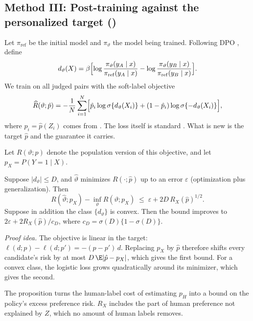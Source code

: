 \subsection{Method III: Post-training against the personalized target (\fsppo)}
\label{sec:post-training}

Let $\pi_{\mathrm{ref}}$ be the initial model and $\pi_\vartheta$ the model being trained. Following
DPO \citep{rafailov2023dpo}, define
\[
  d_\vartheta(X)=\beta\Bigl[\log\frac{\pi_\vartheta(y_A\mid x)}{\pi_{\mathrm{ref}}(y_A\mid x)}
  -\log\frac{\pi_\vartheta(y_B\mid x)}{\pi_{\mathrm{ref}}(y_B\mid x)}\Bigr].
\]
We train on all judged pairs with the soft-label objective
\[
  \widehat R(\vartheta;\hat p)=-\frac1N\sum_{i=1}^{N}
  \Bigl[\hat p_i\log\sigma\{d_\vartheta(X_i)\}+(1-\hat p_i)\log\sigma\{-d_\vartheta(X_i)\}\Bigr],
\]
where $\hat p_i=\hat p(Z_i)$ comes from \dfsp. The loss itself is standard
\citep{lee2024rlaif,furuta2024gapo}. What is new is the target $\hat p$ and the guarantee it carries.

Let $R(\vartheta;p)$ denote the population version of this objective, and let $p_X=P(Y=1\mid X)$.

\begin{proposition}
\label{prop:bridge}
Suppose $|d_\vartheta|\le D$, and $\hat\vartheta$ minimizes $R(\cdot;\hat p)$ up to an error
$\varepsilon$ (optimization plus generalization). Then
\[
  R(\hat\vartheta;p_X)-\inf_\vartheta R(\vartheta;p_X)\;\le\;\varepsilon+2D\,R_X(\hat p)^{1/2}.
\]
Suppose in addition the class $\{d_\vartheta\}$ is convex. Then the bound improves to
$2\varepsilon+2R_X(\hat p)/c_D$, where $c_D=\sigma(D)\{1-\sigma(D)\}$.
\end{proposition}

\noindent\emph{Proof idea.} The objective is linear in the target:
$\ell(d;p)-\ell(d;p')=-(p-p')\,d$. Replacing $p_X$ by $\hat p$ therefore shifts every candidate's
risk by at most $D\,\E|\hat p-p_X|$, which gives the first bound. For a convex class, the logistic
loss grows quadratically around its minimizer, which gives the second.

The proposition turns the human-label cost of estimating $p_H$ into a bound on the policy's excess
preference risk. $R_X$ includes the part of human preference not explained by $Z$, which no
amount of human labels removes.
